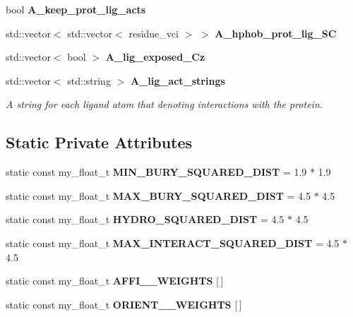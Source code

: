 \begin{CompactItemize}
\item 
bool \textbf{A\_\-keep\_\-prot\_\-lig\_\-acts}\label{classASCbase_1_1ProtLigScore_bbc85c49bf05b6d54a1f786596f47b1f}

\item 
std::vector$<$ std::vector$<$ residue\_\-vci $>$ $>$ \textbf{A\_\-hphob\_\-prot\_\-lig\_\-SC}\label{classASCbase_1_1ProtLigScore_f737fa004d7fa88be1f6f9c6d155b099}

\item 
std::vector$<$ bool $>$ \textbf{A\_\-lig\_\-exposed\_\-Cz}\label{classASCbase_1_1ProtLigScore_c449cc6743b06bef1df97a236a693305}

\item 
std::vector$<$ std::string $>$ \bf{A\_\-lig\_\-act\_\-strings}\label{classASCbase_1_1ProtLigScore_615545947d1470e69c9aa7b0169b4b28}

\begin{CompactList}\small\item\em A string for each ligand atom that denoting interactions with the protein. \item\end{CompactList}\end{CompactItemize}
\subsection*{Static Private Attributes}
\begin{CompactItemize}
\item 
static const my\_\-float\_\-t \textbf{MIN\_\-BURY\_\-SQUARED\_\-DIST} = 1.9 $\ast$ 1.9\label{classASCbase_1_1ProtLigScore_f5458d92783fb455d0a7b474734862ac}

\item 
static const my\_\-float\_\-t \textbf{MAX\_\-BURY\_\-SQUARED\_\-DIST} = 4.5 $\ast$ 4.5\label{classASCbase_1_1ProtLigScore_8351bdb8162c375a142cc69d4125661a}

\item 
static const my\_\-float\_\-t \textbf{HYDRO\_\-SQUARED\_\-DIST} = 4.5 $\ast$ 4.5\label{classASCbase_1_1ProtLigScore_9629a637153e69bc93198e76bd054ff8}

\item 
static const my\_\-float\_\-t \textbf{MAX\_\-INTERACT\_\-SQUARED\_\-DIST} = 4.5 $\ast$ 4.5\label{classASCbase_1_1ProtLigScore_38fd929f2c9ae78cc55b55383e910fa4}

\item 
static const my\_\-float\_\-t \textbf{AFFI\_\_\-WEIGHTS} [$\,$]
\item 
static const my\_\-float\_\-t \textbf{ORIENT\_\_\-WEIGHTS} [$\,$]
\end{CompactItemize}
